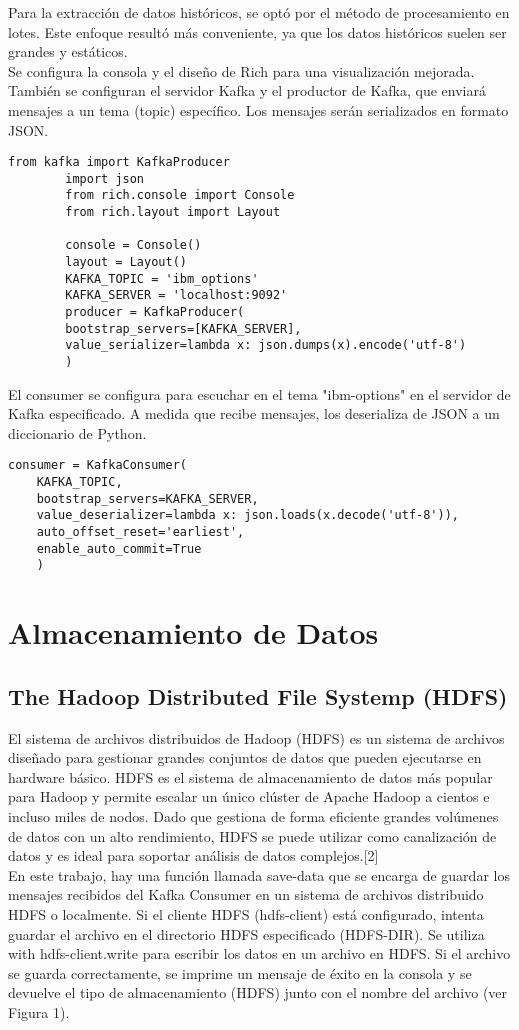 \documentclass{article}
\begin{document}
	Para la extracción de datos históricos, se optó por el método de procesamiento en lotes. Este enfoque resultó más conveniente, ya que los datos históricos suelen ser grandes y estáticos. \\
	Se configura la consola y el diseño de Rich para una visualización mejorada. También se configuran el servidor Kafka y el productor de Kafka, que enviará mensajes a un tema (topic) específico. Los mensajes serán serializados en formato JSON.\\
	\begin{lstlisting}[style=python]
	from kafka import KafkaProducer
		import json
		from rich.console import Console
		from rich.layout import Layout
		
		console = Console()
		layout = Layout()
		KAFKA_TOPIC = 'ibm_options'
		KAFKA_SERVER = 'localhost:9092'
		producer = KafkaProducer(
		bootstrap_servers=[KAFKA_SERVER],
		value_serializer=lambda x: json.dumps(x).encode('utf-8')
		)
	\end{lstlisting}
El consumer se configura para escuchar en el tema "ibm-options" en el servidor de Kafka especificado. A medida que recibe mensajes, los deserializa de JSON a un diccionario de Python.
	\begin{lstlisting}[style=python]
	consumer = KafkaConsumer(
	KAFKA_TOPIC,
	bootstrap_servers=KAFKA_SERVER,
	value_deserializer=lambda x: json.loads(x.decode('utf-8')),
	auto_offset_reset='earliest',
	enable_auto_commit=True
	)
		\end{lstlisting}
	\section{Almacenamiento de Datos}
	\subsection{The Hadoop Distributed File Systemp (HDFS)}
	El sistema de archivos distribuidos de Hadoop (HDFS) es un sistema de archivos diseñado para gestionar grandes conjuntos de datos que pueden ejecutarse en hardware básico. HDFS es el sistema de almacenamiento de datos más popular para Hadoop y permite escalar un único clúster de Apache Hadoop a cientos e incluso miles de nodos. Dado que gestiona de forma eficiente grandes volúmenes de datos con un alto rendimiento, HDFS se puede utilizar como canalización de datos y es ideal para soportar análisis de datos complejos.[2]\\
	En este trabajo, hay una función llamada save-data que se encarga de guardar los mensajes recibidos del Kafka Consumer en un sistema de archivos distribuido HDFS o localmente. Si el cliente HDFS (hdfs-client) está configurado, intenta guardar el archivo en el directorio HDFS especificado (HDFS-DIR). Se utiliza with hdfs-client.write para escribir los datos en un archivo en HDFS. Si el archivo se guarda correctamente, se imprime un mensaje de éxito en la consola y se devuelve el tipo de almacenamiento (HDFS) junto con el nombre del archivo (ver Figura 1).\\
	
\end{document}
